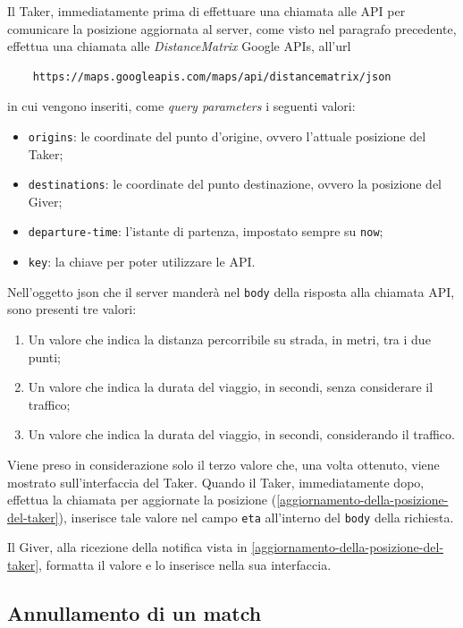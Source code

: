 Il Taker, immediatamente prima di effettuare una chiamata alle API per comunicare la posizione aggiornata al server, come visto nel paragrafo precedente, effettua una chiamata alle \emph{DistanceMatrix} Google APIs, all'url
\begin{verbatim}
    https://maps.googleapis.com/maps/api/distancematrix/json
\end{verbatim}
in cui vengono inseriti, come \textit{query parameters} i seguenti valori:
\begin{itemize}
    \item \texttt{origins}: le coordinate del punto d'origine, ovvero l'attuale posizione del Taker;
    \item \texttt{destinations}: le coordinate del punto destinazione, ovvero la posizione del Giver;
    \item \texttt{departure-time}: l'istante di partenza, impostato sempre su \texttt{now};
    \item \texttt{key}: la chiave per poter utilizzare le API.
\end{itemize}

Nell'oggetto json che il server manderà nel \texttt{body} della risposta alla chiamata API, sono presenti tre valori:
\begin{enumerate}
    \item Un valore che indica la distanza percorribile su strada, in metri, tra i due punti;
    \item Un valore che indica la durata del viaggio, in secondi, senza considerare il traffico;
    \item Un valore che indica la durata del viaggio, in secondi, considerando il traffico.
\end{enumerate}

Viene preso in considerazione solo il terzo valore che, una volta ottenuto, viene mostrato sull'interfaccia del Taker. Quando il Taker, immediatamente dopo, effettua la chiamata per aggiornate la posizione (\autoref{aggiornamento-della-posizione-del-taker}), inserisce tale valore nel campo \texttt{eta} all'interno del \texttt{body} della richiesta. 

Il Giver, alla ricezione della notifica vista in \autoref{aggiornamento-della-posizione-del-taker}, formatta il valore e lo inserisce nella sua interfaccia. 

\hypertarget{annullamento-di-un-match}{%
\subsection{Annullamento di un match}\label{annullamento-di-un-match}}

